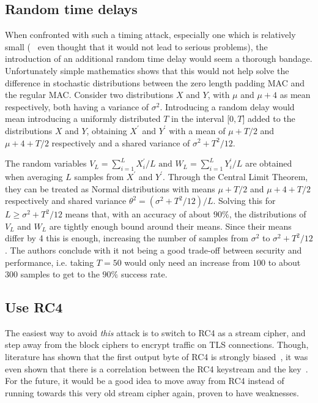 \documentclass[10pt,conference,a4paper]{IEEEtran}
\begin{document}
\subsection{Random time delays}
\label{sec:future:random}
When confronted with such a timing attack, especially one which is relatively small (~\cite{ietf2008transport} even thought that it would not lead to serious problems), the introduction of an additional random time delay would seem a thorough bandage. Unfortunately simple mathematics shows that this would not help solve the difference in stochastic distributions between the zero length padding MAC and the regular MAC. Consider two distributions $X$ and $Y$, with $\mu$ and $\mu + 4$ as mean respectively, both having a variance of $\sigma^2$. Introducing a random delay would mean introducing a uniformly distributed $T$ in the interval [$0,T$] added to the distributions $X$ and $Y$, obtaining $X^{'}$ and $Y^{'}$ with a mean of $\mu + T/2$ and $\mu + 4 + T/2$ respectively and a shared variance of $\sigma^2 + T^2/12$.

The random variables $V_L = \sum_{i=1}^L X_i^{'}/L \text{ and } W_L = \sum_{i=1}^L Y_i^{'}/L$ are obtained when averaging $L$ samples from $X^{'}$ and $Y^{'}$. Through the Central Limit Theorem, they can be treated as Normal distributions with means $\mu + T/2$ and $\mu + 4 + T/2$ respectively and shared variance $\theta^2 = (\sigma^2 + T^2/12)/L$. Solving this for $L \geq \sigma^2 + T^2/12$ means that, with an accuracy of about $90\%$, the distributions of $V_L$ and $W_L$ are tightly enough bound around their means. Since their means differ by 4 this is enough, increasing the number of samples from $\sigma^2$ to $\sigma^2 + T^2/12$. The authors conclude with it not being a good trade-off between security and performance, i.e. taking $T = 50$ would only need an increase from $100$ to about $300$ samples to get to the $90\%$ success rate.

\subsection{Use RC4}
\label{sec:future:rc4}
The easiest way to avoid \textit{this} attack is to switch to RC4 as a stream cipher, and step away from the block ciphers to encrypt traffic on TLS connections. Though, literature has shown that the first output byte of RC4 is strongly biased~\cite{fluhrer2001weaknesses}, it was even shown that there is a correlation between the RC4 keystream and the key~\cite{klein2008attacks}. For the future, it would be a good idea to move away from RC4 instead of running towards this very old stream cipher again, proven to have weaknesses.
\end{document}
